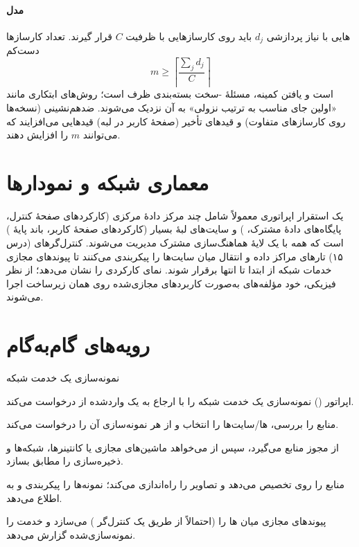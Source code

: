 \documentclass[11pt,a4paper]{article}
\begin{document}
\paragraph{مدل} هایی با نیاز پردازشی $d_j$ باید روی کارسازهایی با ظرفیت $C$ قرار گیرند. تعداد کارسازها دست‌کم
\begin{equation}\label{eq:binpack}
  m \ge \left\lceil \frac{\sum_j d_j}{C} \right\rceil
\end{equation}
است و یافتن کمینه، مسئلهٔ -سخت بسته‌بندی ظرف است؛ روش‌های ابتکاری مانند «اولین جای مناسب به ترتیب نزولی» به آن
نزدیک می‌شوند. ضدهم‌نشینی (نسخه‌ها روی کارسازهای متفاوت) و قیدهای تأخیر (صفحهٔ کاربر در لبه) قیدهایی می‌افزایند که
می‌توانند $m$ را افزایش دهند.

\section{معماری شبکه و نمودارها}
یک استقرار  اپراتوری معمولاً شامل چند مرکز دادهٔ مرکزی (کارکردهای صفحهٔ کنترل، پایگاه‌های دادهٔ مشترک،
) و سایت‌های لبهٔ بسیار (کارکردهای صفحهٔ کاربر، باند پایهٔ ) است که همه با یک لایهٔ هماهنگ‌سازی مشترک
مدیریت می‌شوند. کنترل‌گرهای  (درس ۱۵) تارهای مراکز داده و انتقال میان سایت‌ها را پیکربندی می‌کنند تا پیوندهای مجازی
خدمات شبکه از ابتدا تا انتها برقرار شوند.  نمای کارکردی را نشان می‌دهد؛ از نظر فیزیکی، خود مؤلفه‌های
 به‌صورت کاربردهای مجازی‌شده روی همان زیرساخت اجرا می‌شوند.

\section{رویه‌های گام‌به‌گام}

\begin{procedurebox}{نمونه‌سازی یک خدمت شبکه}\label{proc:inst}
\begin{steps}
  \item اپراتور () نمونه‌سازی یک خدمت شبکه را با ارجاع به یک  واردشده از  درخواست می‌کند.
  \item {} منابع را بررسی، ها/سایت‌ها را انتخاب و از  هر  نمونه‌سازی آن را درخواست می‌کند.
  \item {} از  مجوز منابع می‌گیرد، سپس از  می‌خواهد ماشین‌های مجازی یا کانتینرها، شبکه‌ها و
        ذخیره‌سازی را مطابق  بسازد.
  \item {} منابع را روی  تخصیص می‌دهد و تصاویر را راه‌اندازی می‌کند؛  نمونه‌ها را پیکربندی و به
         اطلاع می‌دهد.
  \item {} پیوندهای مجازی میان ها را (احتمالاً از طریق یک کنترل‌گر ) می‌سازد و خدمت را نمونه‌سازی‌شده
        گزارش می‌دهد.
\end{steps}
\end{procedurebox}
\end{document}
